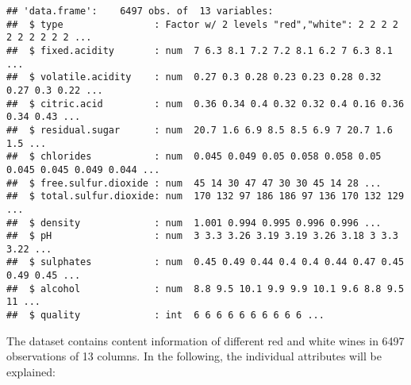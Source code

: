 \documentclass[
]{article}
\begin{document}
\begin{verbatim}
## 'data.frame':    6497 obs. of  13 variables:
##  $ type                : Factor w/ 2 levels "red","white": 2 2 2 2 2 2 2 2 2 2 ...
##  $ fixed.acidity       : num  7 6.3 8.1 7.2 7.2 8.1 6.2 7 6.3 8.1 ...
##  $ volatile.acidity    : num  0.27 0.3 0.28 0.23 0.23 0.28 0.32 0.27 0.3 0.22 ...
##  $ citric.acid         : num  0.36 0.34 0.4 0.32 0.32 0.4 0.16 0.36 0.34 0.43 ...
##  $ residual.sugar      : num  20.7 1.6 6.9 8.5 8.5 6.9 7 20.7 1.6 1.5 ...
##  $ chlorides           : num  0.045 0.049 0.05 0.058 0.058 0.05 0.045 0.045 0.049 0.044 ...
##  $ free.sulfur.dioxide : num  45 14 30 47 47 30 30 45 14 28 ...
##  $ total.sulfur.dioxide: num  170 132 97 186 186 97 136 170 132 129 ...
##  $ density             : num  1.001 0.994 0.995 0.996 0.996 ...
##  $ pH                  : num  3 3.3 3.26 3.19 3.19 3.26 3.18 3 3.3 3.22 ...
##  $ sulphates           : num  0.45 0.49 0.44 0.4 0.4 0.44 0.47 0.45 0.49 0.45 ...
##  $ alcohol             : num  8.8 9.5 10.1 9.9 9.9 10.1 9.6 8.8 9.5 11 ...
##  $ quality             : int  6 6 6 6 6 6 6 6 6 6 ...
\end{verbatim}

The dataset contains content information of different red and white
wines in 6497 observations of 13 columns. In the following, the
individual attributes will be explained:
\end{document}
